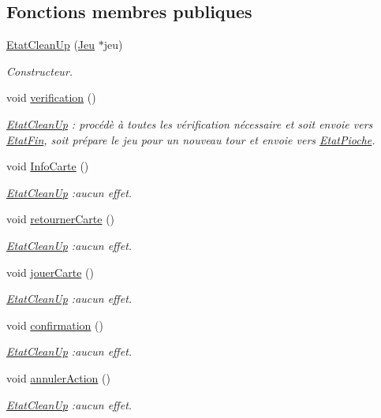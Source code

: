 \subsection*{Fonctions membres publiques}
\begin{DoxyCompactItemize}
\item 
\hyperlink{class_etat_clean_up_a04f3ac957a6a240981991bf170ef3d1a}{Etat\-Clean\-Up} (\hyperlink{class_jeu}{Jeu} $\ast$jeu)
\begin{DoxyCompactList}\small\item\em Constructeur. \end{DoxyCompactList}\item 
void \hyperlink{class_etat_clean_up_a58245fa6e240c4c4f20d1a1fca868571}{verification} ()
\begin{DoxyCompactList}\small\item\em \hyperlink{class_etat_clean_up}{Etat\-Clean\-Up} \-: procédè à toutes les vérification nécessaire et soit envoie vers \hyperlink{class_etat_fin}{Etat\-Fin}, soit prépare le jeu pour un nouveau tour et envoie vers \hyperlink{class_etat_pioche}{Etat\-Pioche}. \end{DoxyCompactList}\item 
void \hyperlink{class_etat_clean_up_aac0dacd1f4945a971ec72319c979a786}{Info\-Carte} ()
\begin{DoxyCompactList}\small\item\em \hyperlink{class_etat_clean_up}{Etat\-Clean\-Up} \-:aucun effet. \end{DoxyCompactList}\item 
void \hyperlink{class_etat_clean_up_a955f6fb5a4cffdbdca4348b90d59ad78}{retourner\-Carte} ()
\begin{DoxyCompactList}\small\item\em \hyperlink{class_etat_clean_up}{Etat\-Clean\-Up} \-:aucun effet. \end{DoxyCompactList}\item 
void \hyperlink{class_etat_clean_up_a3be20ce132ee978e5412ae54f36e4a78}{jouer\-Carte} ()
\begin{DoxyCompactList}\small\item\em \hyperlink{class_etat_clean_up}{Etat\-Clean\-Up} \-:aucun effet. \end{DoxyCompactList}\item 
void \hyperlink{class_etat_clean_up_a4c0dbb8c302a500052eccdc66c6a28b4}{confirmation} ()
\begin{DoxyCompactList}\small\item\em \hyperlink{class_etat_clean_up}{Etat\-Clean\-Up} \-:aucun effet. \end{DoxyCompactList}\item 
void \hyperlink{class_etat_clean_up_a7163c116050f238c7bcd43a7e9bae974}{annuler\-Action} ()
\begin{DoxyCompactList}\small\item\em \hyperlink{class_etat_clean_up}{Etat\-Clean\-Up} \-:aucun effet. \end{DoxyCompactList}\end{DoxyCompactItemize}


